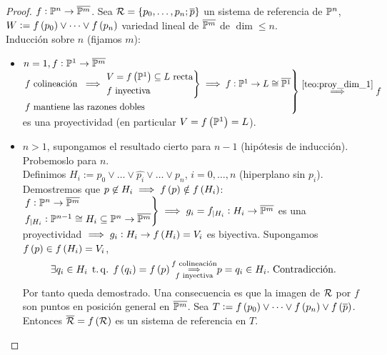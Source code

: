 \begin{proof}
    $f : \mathbb{P}^n \to \overline{\mathbb{P}^m}$. Sea $\mathcal{R} = \{ p_0, \dots, p_n; \overline{p} \}$ un sistema de referencia de $\mathbb{P}^n$, $W := f \left( p_0 \right) \vee \dots \vee f \left( p_n \right)$ variedad lineal de $\overline{\mathbb{P}^m}$ de $\dim \leq n$. \\
    Inducción sobre $n$ (fijamos $m$):
    \begin{itemize}
        \item $n = 1, f : \mathbb{P}^1 \to \overline{\mathbb{P}^m}$ \\
        $\begin{rcases}
            f \text{ colineación } \implies 
            \begin{rcases}
                V = f \left( \mathbb{P}^1 \right) \subseteq L \text{ recta} \\
                f \text{ inyectiva}
            \end{rcases}
            \implies f : \mathbb{P}^1 \to L \cong \overline{\mathbb{P}^1} \\
            f \text{ mantiene las razones dobles}
        \end{rcases}
        \stackrel{\ref{teo:proy_dim_1}}{\implies} f$ es una proyectividad (en particular $V = f \left( \mathbb{P}^1 \right) = L$).
        \item $n > 1$, supongamos el resultado cierto para $n-1$ (hipótesis de inducción). Probemoslo para $n$. \\
        Definimos $H_i := p_0 \vee \dots \vee \widehat{p_i} \vee \dots \vee p_n$, $i = 0, \dots, n$ (hiperplano sin $p_i$). Demostremos que $p \not \in H_i \implies f \left( p \right) \notin f \left( H_i \right)$: \\
        $\begin{rcases}
            f : \mathbb{P}^n \to \overline{\mathbb{P}^m} \\
            f_{|H_i} : \mathbb{P}^{n-1} \cong H_i \subseteq \mathbb{P}^n \to \overline{\mathbb{P}^m}
        \end{rcases}
        \implies g_i = f_{|H_i} : H_i \to \overline{\mathbb{P}^m}$ es una proyectividad $\implies g_i : H_i \to f \left( H_i \right) = V_i$ es biyectiva. Supongamos $f \left( p \right) \in f \left( H_i \right) = V_i$,
        \[
            \exists q_i \in H_i \operatorname{\;t.q.\;} f \left( q_i \right) = f \left( p \right) \substack{f \text{ colineación} \\ \implies \\ f \text{ inyectiva}} p = q_i \in H_i. \text{ Contradicción.}
        \]
        Por tanto queda demostrado. Una consecuencia es que la imagen de $\mathcal{R}$ por $f$ son puntos en posición general en $\overline{\mathbb{P}^m}$. Sea $T := f \left( p_0 \right) \vee \dots \vee f \left( p_n \right) \vee f \left( \overline{p} \right)$. Entonces $\overline{\mathcal{R}} = f \left( \mathcal{R} \right)$ es un sistema de referencia en $T$.
        

\end{itemize}
\end{proof}
